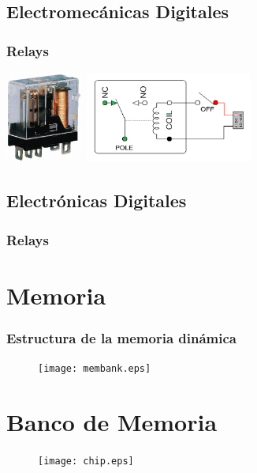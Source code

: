 \documentclass{beamer}
\begin{document}
\subsection{Electromecánicas Digitales}
\begin{frame}
\frametitle{Relays}
\begin{center}
\hfill
\includegraphics[height=3cm]{relay-imagen.jpg}
\hfill
\includegraphics[height=3cm]{relay-diagrama.png}
\end{center}
\end{frame}

\subsection{Electrónicas Digitales}
\begin{frame}
\frametitle{Relays}
\begin{center}
\end{center}
\end{frame}

\section{Memoria}
\begin{frame}
\frametitle{Estructura de la  memoria dinámica}
\begin{figure}[!htb]
\centering
\texttt{[image: membank.eps]}
\end{figure}
\end{frame}

\section{Banco de Memoria}
\begin{frame}
\begin{figure}[!htb]
\centering
\texttt{[image: chip.eps]}
\end{figure}
\end{frame}
\end{document}
